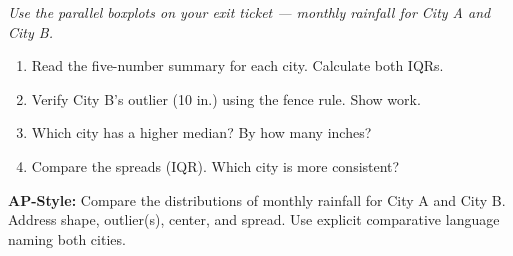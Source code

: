 \documentclass[aspectratio=169, 11pt]{beamer}
\begin{document}
{
\begin{frame}[t, plain]
  \vspace{0.8em}%
  \hspace{0.55cm}%
  \begin{minipage}{0.9\textwidth}
    \small
    \textit{Use the parallel boxplots on your exit ticket --- monthly rainfall
    for City A and City B.}

    \vspace{0.5em}
    \begin{enumerate}\setlength{\itemsep}{0.5em}
      \item Read the five-number summary for each city.
            Calculate both IQRs.
      \item Verify City B's outlier (10 in.) using the fence rule. Show work.
      \item Which city has a higher median? By how many inches?
      \item Compare the spreads (IQR). Which city is more consistent?
    \end{enumerate}

    \vspace{0.4em}
    \textbf{AP-Style:} Compare the distributions of monthly rainfall
    for City A and City B. Address shape, outlier(s), center, and spread.
    Use explicit comparative language naming both cities.
  \end{minipage}
\end{frame}
}
\end{document}
